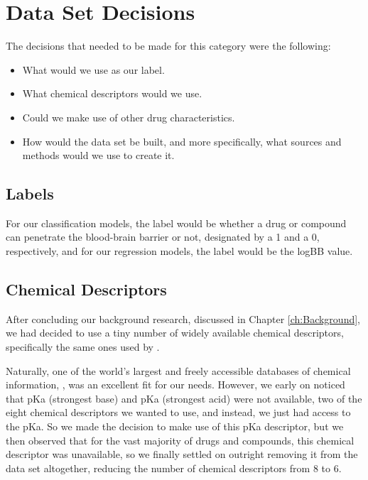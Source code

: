 \section{Data Set Decisions}
\label{sec:Dataset_Decisions}

The decisions that needed to be made for this category were the following:

\begin{itemize}
    \item
    What would we use as our label.
    \item
    What chemical descriptors would we use.
    \item
    Could we make use of other drug characteristics.
    \item
    How would the data set be built, and more specifically, what sources and methods would we use to create it.
\end{itemize}

\subsection{Labels}
\label{subsec:Labels}

For our classification models, the label would be whether a drug or compound can penetrate the blood-brain barrier or not, designated by a 1 and a 0, respectively, and for our regression models, the label would be the logBB value.

\subsection{Chemical Descriptors}
\label{subsec:Chemical_Descriptors}

After concluding our background research, discussed in Chapter \ref{ch:Background}, we had decided to use a tiny number of widely available chemical descriptors, specifically the same ones used by \citet{Saber2020}. 

Naturally, one of the world's largest and freely accessible databases of chemical information, \citet{PubChem}, was an excellent fit for our needs. However, we early on noticed that pKa (strongest base) and pKa (strongest acid) were not available, two of the eight chemical descriptors we wanted to use, and instead, we just had access to the pKa. So we made the decision to make use of this pKa descriptor, but we then observed that for the vast majority of drugs and compounds, this chemical descriptor was unavailable, so we finally settled on outright removing it from the data set altogether, reducing the number of chemical descriptors from 8 to 6.

